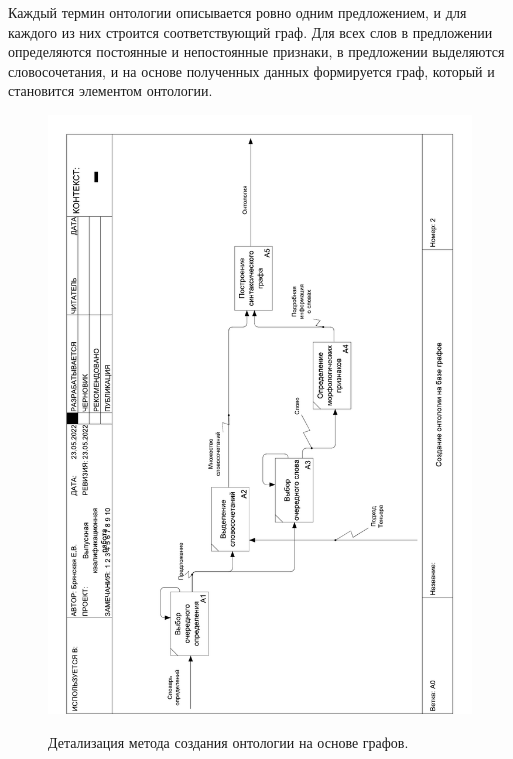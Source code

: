 \newpage
Каждый термин онтологии описывается ровно одним предложением, и для каждого из них строится соответствующий граф. Для всех слов в предложении определяются постоянные и непостоянные признаки, в предложении выделяются словосочетания, и на основе полученных данных формируется граф, который и становится элементом онтологии.
\begin{figure}[h]
	\begin{center}
		{\includegraphics[scale = 0.57, angle=-90]{img/idef0/pdf/ontologyTree_2page.pdf}}
		\caption{Детализация метода создания онтологии на основе графов.}
		\label{fig26:image}
	\end{center}
\end{figure}

